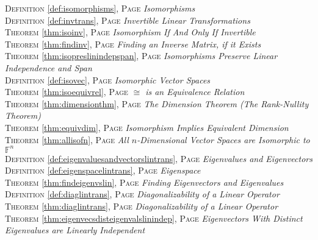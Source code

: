 \begin{multicols}{2}
{\textsc{Definition} \ref{def:isomorphisms}, \textsc{Page} \pageref{def:isomorphisms} \textit{Isomorphisms} \\
\textsc{Definition} \ref{def:invtrans}, \textsc{Page} \pageref{def:invtrans} \textit{Invertible Linear Transformations} \\
\textsc{Theorem} \ref{thm:isoinv}, \textsc{Page} \pageref{thm:isoinv} \textit{Isomorphism If And Only If Invertible} \\
\textsc{Theorem} \ref{thm:findinv}, \textsc{Page} \pageref{thm:findinv} \textit{Finding an Inverse Matrix, if it Exists} \\
\textsc{Theorem} \ref{thm:isopreslinindepspan}, \textsc{Page} \pageref{thm:isopreslinindepspan} \textit{Isomorphisms Preserve Linear Independence and Span} \\
\textsc{Definition} \ref{def:isovec}, \textsc{Page} \pageref{def:isovec} \textit{Isomorphic Vector Spaces} \\
\textsc{Theorem} \ref{thm:isoequivrel}, \textsc{Page} \pageref{thm:isoequivrel} \textit{\(\cong \) is an Equivalence Relation} \\
\textsc{Theorem} \ref{thm:dimensionthm}, \textsc{Page} \pageref{thm:dimensionthm} \textit{The Dimension Theorem (The Rank-Nullity Theorem)} \\
\textsc{Theorem} \ref{thm:equivdim}, \textsc{Page} \pageref{thm:equivdim} \textit{Isomorphism Implies Equivalent Dimension} \\
\textsc{Theorem} \ref{thm:allisofn}, \textsc{Page} \pageref{thm:allisofn} \textit{All \(n\)-Dimensional Vector Spaces are Isomorphic to \(\mathbb {F}^n\)} \\
\textsc{Definition} \ref{def:eigenvaluesandvectorslintrans}, \textsc{Page} \pageref{def:eigenvaluesandvectorslintrans} \textit{Eigenvalues and Eigenvectors} \\
\textsc{Definition} \ref{def:eigenspacelintrans}, \textsc{Page} \pageref{def:eigenspacelintrans} \textit{Eigenspace} \\
\textsc{Theorem} \ref{thm:findeigenvslin}, \textsc{Page} \pageref{thm:findeigenvslin} \textit{Finding Eigenvectors and Eigenvalues} \\
\textsc{Definition} \ref{def:diaglintrans}, \textsc{Page} \pageref{def:diaglintrans} \textit{Diagonalizability of a Linear Operator} \\
\textsc{Theorem} \ref{thm:diaglintrans}, \textsc{Page} \pageref{thm:diaglintrans} \textit{Diagonalizability of a Linear Operator} \\
\textsc{Theorem} \ref{thm:eigenvecsdisteigenvalslinindep}, \textsc{Page} \pageref{thm:eigenvecsdisteigenvalslinindep} \textit{Eigenvectors With Distinct Eigenvalues are Linearly Independent} \\
}
\end{multicols}
